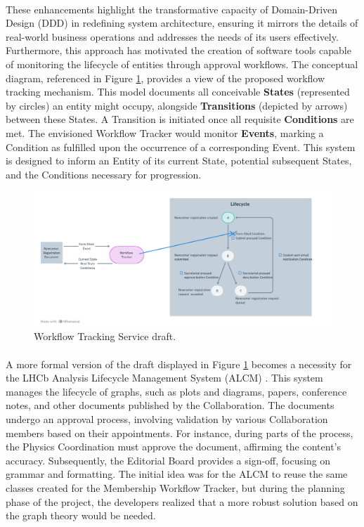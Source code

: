 \paragraph{}These enhancements highlight the transformative capacity of Domain-Driven Design (DDD) in redefining system architecture, ensuring it mirrors the details of real-world business operations and addresses the needs of its users effectively. Furthermore, this approach has motivated the creation of software tools capable of monitoring the lifecycle of entities through approval workflows. The conceptual diagram, referenced in Figure \ref{fig:cap_2_workflow_draft}, provides a view of the proposed workflow tracking mechanism. This model documents all conceivable \textbf{States} (represented by circles) an entity might occupy, alongside \textbf{Transitions} (depicted by arrows) between these States. A Transition is initiated once all requisite \textbf{Conditions} are met. The envisioned Workflow Tracker would monitor \textbf{Events}, marking a Condition as fulfilled upon the occurrence of a corresponding Event. This system is designed to inform an Entity of its current State, potential subsequent States, and the Conditions necessary for progression.

\begin{figure}[H]
    \centering
    \includegraphics[width=1\linewidth]{figuras/workflow_draft.png}
    \caption{Workflow Tracking Service draft.}
    \label{fig:cap_2_workflow_draft}
\end{figure}

\paragraph{} A more formal version of the draft displayed in Figure \ref{fig:cap_2_workflow_draft} becomes a necessity for the LHCb Analysis Lifecycle Management System (ALCM) \cite{alcm}. This system manages the lifecycle of graphs, such as plots and diagrams, papers, conference notes, and other documents published by the Collaboration. The documents undergo an approval process, involving validation by various Collaboration members based on their appointments. For instance, during parts of the process, the Physics Coordination must approve the document, affirming the content's accuracy. Subsequently, the Editorial Board provides a sign-off, focusing on grammar and formatting. The initial idea was for the ALCM to reuse the same classes created for the Membership Workflow Tracker, but during the planning phase of the project, the developers realized that a more robust solution based on the graph theory would be needed.


